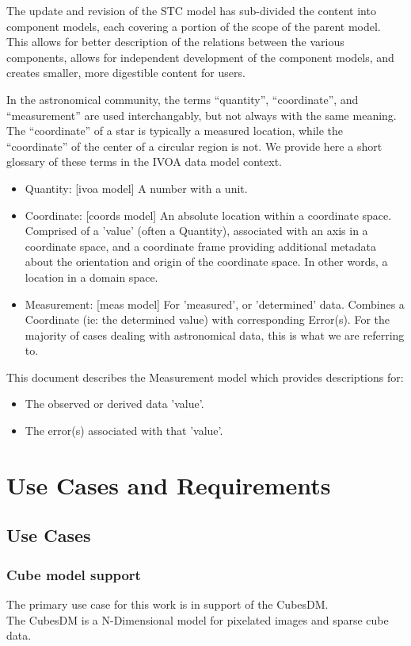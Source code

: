 \documentclass[11pt,a4paper]{ivoa}
\begin{document}
The update and revision of the STC model has sub-divided the content into component models, each covering a portion of the scope of the parent model.  This allows for better description of the relations between the various components, allows for independent development of the component models, and creates smaller, more digestible content for users.

In the astronomical community, the terms ``quantity'', ``coordinate'', and ``measurement'' are used interchangably, but not always with the same meaning.  The ``coordinate'' of a star is typically a measured location, while the ``coordinate'' of the center of a circular region is not.  We provide here a short glossary of these terms in the IVOA data model context.
\begin{itemize}
  \item Quantity: [ivoa model]  A number with a unit.
  \item Coordinate: [coords model]  An absolute location within a coordinate space.  Comprised of a 'value' (often a Quantity), associated with an axis in a coordinate space, and a coordinate frame providing additional metadata about the orientation and origin of the coordinate space.  In other words, a location in a domain space.
  \item Measurement: [meas model]  For 'measured', or 'determined' data.  Combines a Coordinate (ie: the determined value) with corresponding Error(s).  For the majority of cases dealing with astronomical data, this is what we are referring to.
\end{itemize}

This document describes the Measurement model which provides descriptions for:
\begin{itemize}
  \item The observed or derived data 'value'.
  \item The error(s) associated with that 'value'.
\end{itemize}

\section{Use Cases and Requirements}
\label{sect:ucreq}

\subsection{Use Cases}
\label{sect:usecases}

\subsubsection{Cube model support}
\label{uc:Cube-model-support}
  The primary use case for this work is in support of the CubesDM. \\
  The CubesDM is a N-Dimensional model for pixelated images and sparse cube data. 
 
\end{document}
